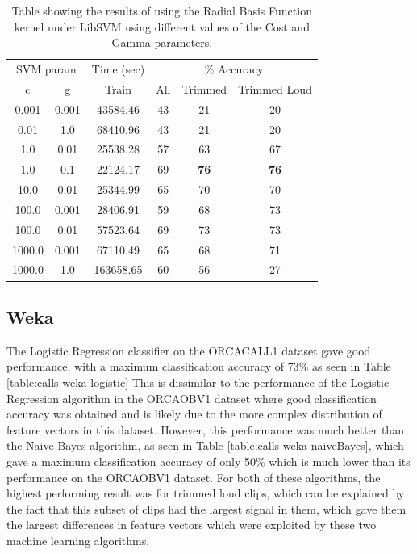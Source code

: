 %
%
\begin{table}
\begin{tabular}{|c|c|c|c|c|c|}
\hline
\multicolumn{2}{|c|}{SVM param} & \multicolumn{1}{c|}{Time (sec)} & \multicolumn{3}{c|}{\% Accuracy} \\
\hhline{|-|-|-|-|-|-|}
c & g & Train & All & Trimmed & Trimmed Loud \\
\hhline{|=|=|=|=|=|=|}
0.001  & 0.001   &    43584.46   &  43  & 21 & 20 \\
0.01   & 1.0     &    68410.96   &  43  & 21 & 20 \\
1.0    & 0.01    &    25538.28   &  57  & 63 & 67 \\
1.0    & 0.1     &    22124.17   &  69  & \textbf{76} & \textbf{76} \\
10.0   & 0.01    &    25344.99   &  65  & 70 & 70 \\
100.0  & 0.001   &    28406.91   &  59  & 68 & 73 \\
100.0  & 0.01    &    57523.64   &  69  & 73 & 73 \\
1000.0 & 0.001   &    67110.49   &  65  & 68 & 71 \\
1000.0 & 1.0     &   163658.65   &  60  & 56 & 27 \\
\hline
\end{tabular}
\caption{Table showing the results of using the Radial Basis Function
  kernel under LibSVM using different values of the Cost and Gamma
  parameters.}
\label{table:calls-libsvm-rbf}
\end{table}

%
%
\subsection{Weka}

The Logistic Regression classifier on the ORCACALL1 dataset gave good
performance, with a maximum classification accuracy of 73\% as seen in
Table \ref{table:calls-weka-logistic} This is dissimilar to the
performance of the Logistic Regression algorithm in the ORCAOBV1
dataset where good classification accuracy was obtained and is likely
due to the more complex distribution of feature vectors in this
dataset.  However, this performance was much better than the Naive
Bayes algorithm, as seen in Table \ref{table:calls-weka-naiveBayes},
which gave a maximum classification accuracy of only 50\% which is
much lower than its performance on the ORCAOBV1 dataset.  For both of
these algorithms, the highest performing result was for trimmed loud
clips, which can be explained by the fact that this subset of clips
had the largest signal in them, which gave them the largest
differences in feature vectors which were exploited by these two
machine learning algorithms.

